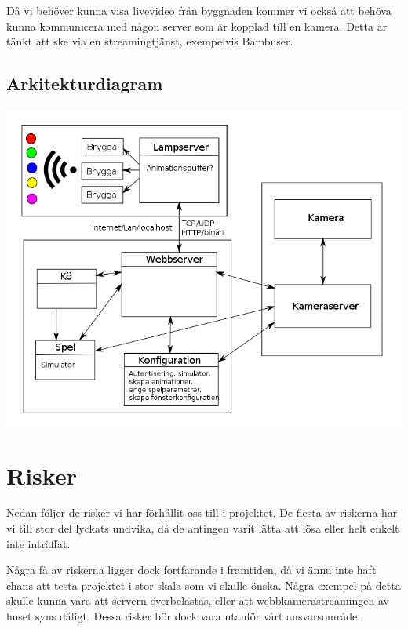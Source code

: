 \documentclass[a4paper,11pt]{article}
\begin{document}
  Då vi behöver kunna visa livevideo från byggnaden kommer vi också att behöva
  kunna kommunicera med någon server som är kopplad till en kamera.  Detta är
  tänkt att ske via en streamingtjänst, exempelvis Bambuser.


\subsection{Arkitekturdiagram}

  \includegraphics[width=\textwidth]{component_diagram.png}



\section{Risker}

  Nedan följer de risker vi har förhållit oss till i projektet.
  De flesta av riskerna har vi till stor del lyckats undvika,
  då de antingen varit lätta att lösa eller helt enkelt inte inträffat.

  Några få av riskerna ligger dock fortfarande i framtiden, då vi ännu
  inte haft chans att testa projektet i stor skala som vi skulle önska.
  Några exempel på detta skulle kunna vara att servern överbelastas,
  eller att webbkamerastreamingen av huset syns dåligt. Dessa risker
  bör dock vara utanför vårt ansvarsområde.
\end{document}
